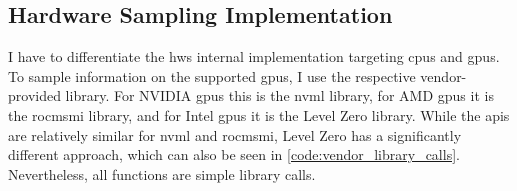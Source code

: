     



\subsection{Hardware Sampling Implementation}

I have to differentiate the hws internal implementation targeting \glspl{cpu} and \glspl{gpu}.
To sample information on the supported \glspl{gpu}, I use the respective vendor-provided library. 
For NVIDIA \glspl{gpu} this is the \gls{nvml} library, for AMD \glspl{gpu} it is the \gls{rocmsmi} library, and for Intel \glspl{gpu} it is the Level Zero library. 
While the \glspl{api} are relatively similar for \gls{nvml} and \gls{rocmsmi}, Level Zero has a significantly different approach, which can also be seen in \autoref{code:vendor_library_calls}. 
Nevertheless, all functions are simple library calls.


